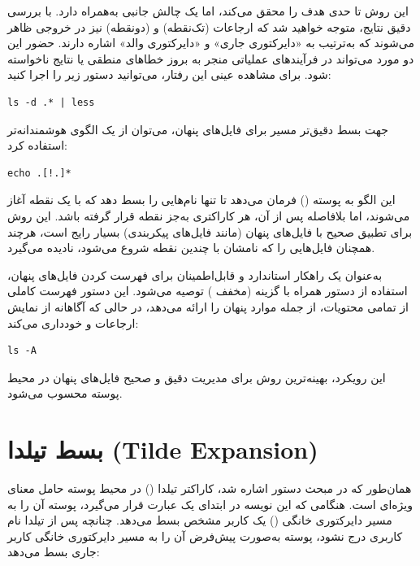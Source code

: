 این روش تا حدی هدف را محقق می‌کند، اما یک چالش جانبی به‌همراه دارد. با بررسی دقیق نتایج، متوجه خواهید شد که ارجاعات  (تک‌نقطه) و  (دونقطه) نیز در خروجی ظاهر می‌شوند که به‌ترتیب به «دایرکتوری جاری» و «دایرکتوری والد» اشاره دارند. حضور این دو مورد می‌تواند در فرآیندهای عملیاتی منجر به بروز خطاهای منطقی یا نتایج ناخواسته شود. برای مشاهده عینی این رفتار، می‌توانید دستور زیر را اجرا کنید:

\begin{latin}
\begin{lstlisting}
ls -d .* | less
\end{lstlisting}
\end{latin}

جهت بسط دقیق‌تر مسیر برای فایل‌های پنهان، می‌توان از یک الگوی هوشمندانه‌تر استفاده کرد:

\begin{latin}
\begin{lstlisting}
echo .[!.]*
\end{lstlisting}
\end{latin}

این الگو به پوسته () فرمان می‌دهد تا تنها نام‌هایی را بسط دهد که با یک نقطه آغاز می‌شوند، اما بلافاصله پس از آن، هر کاراکتری به‌جز نقطه قرار گرفته باشد. این روش برای تطبیق صحیح با فایل‌های پنهان (مانند فایل‌های پیکربندی) بسیار رایج است، هرچند همچنان فایل‌هایی را که نامشان با چندین نقطه شروع می‌شود، نادیده می‌گیرد.

به‌عنوان یک راهکار استاندارد و قابل‌اطمینان برای فهرست کردن فایل‌های پنهان، استفاده از دستور  همراه با گزینه  (مخفف ) توصیه می‌شود. این دستور فهرست کاملی از تمامی محتویات، از جمله موارد پنهان را ارائه می‌دهد، در حالی که آگاهانه از نمایش ارجاعات  و  خودداری می‌کند:

\begin{latin}
\begin{lstlisting}
ls -A
\end{lstlisting}
\end{latin}

این رویکرد، بهینه‌ترین روش برای مدیریت دقیق و صحیح فایل‌های پنهان در محیط پوسته محسوب می‌شود.

\section{بسط تیلدا (Tilde Expansion)}

همان‌طور که در مبحث دستور  اشاره شد، کاراکتر تیلدا (\cmd{\textasciitilde}) در محیط پوسته حامل معنای ویژه‌ای است. هنگامی که این نویسه در ابتدای یک عبارت قرار می‌گیرد، پوسته آن را به مسیر دایرکتوری خانگی () یک کاربر مشخص بسط می‌دهد. چنانچه پس از تیلدا نام کاربری درج نشود، پوسته به‌صورت پیش‌فرض آن را به مسیر دایرکتوری خانگی کاربر جاری بسط می‌دهد:

